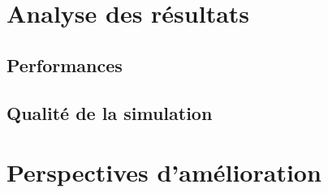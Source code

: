 \documentclass[12pt,a4paper,sans]{article}
\begin{document}
\section{Analyse des résultats}
\subsection{Performances}
\subsection{Qualité de la simulation}

\section{Perspectives d'amélioration}
\end{document}
